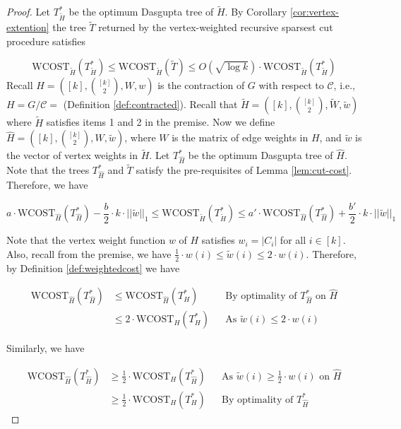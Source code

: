 \documentclass[letterpaper,11pt]{article}
\newcommand{\wCT}{\text{WCOST}}
\newcommand{\cC}{\mathcal{C}}
\theoremstyle{plain}
\theoremstyle{definition}
\theoremstyle{remark}
\newcommand{\wt}[1]{\widetilde{#1}}
\begin{document}
\begin{proof}
	Let $T^*_{\wt{H}}$ be the optimum Dasgupta tree of $\wt{H}$. By Corollary \ref{cor:vertex-extention} 
	the tree $\wt{T}$ returned by the vertex-weighted recursive sparsest cut procedure satisfies 

	\begin{equation} \label{eq:est1:tstar}
		\wCT_{\wt{H}}(T^*_{\wt{H}})\leq \wCT_{\wt{H}}(\wt{T}) \leq O(\sqrt{\log k})\cdot \wCT_{\wt{H}}(T^*_{\wt{H}})
	\end{equation}
Recall $H=\left([k], {[k] \choose 2}, W, w\right)$ is the contraction of $G$ with respect to $\cC$, 
	i.e., $H=G/\cC=$  (Definition \ref{def:contracted}). 
	Recall that $\widetilde{H} =\left([k], {[k] \choose 2}, \widetilde{W}, \widetilde{w}\right)$ 
	where $\widetilde{H}$ satisfies items 1 and 2 in the premise. Now we define 
	$\widehat{H}=\left([k], {[k] \choose 2}, W, \widetilde{w}\right)$, 
	where $W$ is the matrix of edge weights in $H$, and $\widetilde{w}$ is the vector of vertex weights in $\widetilde{H}$. Let $T^*_{\widehat{H}}$ be the optimum Dasgupta tree of $\widehat{H}$.
	Note that the trees $T^*_{\widehat{H}}$ and $\wt{T}$ satisfy the pre-requisites of
	Lemma \ref{lem:cut-cost}. Therefore, we have 

	\begin{equation}
		\label{eq:qhat-qtilde}
		a \cdot \wCT_{\widehat{H}}(T^*_{\widehat{H}}) - \frac{b}{2} \cdot k \cdot ||\widetilde{w}||_1   \leq \wCT_{\wt{H}}(T^*_{\wt{H}}) \leq a' \cdot \wCT_{\widehat{H}}(T^*_{\widehat{H}}) + \frac{b'}{2} \cdot k \cdot ||\widetilde{w}||_1  
	\end{equation}

	Note that the vertex weight function $w$ of $H$ satisfies $w_i=|C_i|$ 
	for all $i\in [k]$. Also, recall from the premise, we have 
	$\frac{1}{2}\cdot w(i)\leq\widetilde{w}(i)\leq 2\cdot w(i)$. Therefore, by 
	Definition \ref{def:weightedcost} we have

	\begin{align}
		\label{eq:tt'11}
		\wCT_{\widehat{H}}(T^*_{\widehat{H}}) 
		&\leq \wCT_{\widehat{H}}(T^*_{H}) &&\text{By optimality of $T^*_{\widehat{H}}$ on $\widehat{H}$} \nonumber\\
		&\leq 2\cdot \wCT_{H}(T^*_{H}) &&\text{As $\widetilde{w}(i)\leq 2\cdot w(i)$}
	\end{align}

	Similarly, we have

	\begin{align}
		\label{eq:tt'22}
		\wCT_{\widehat{H}}(T^*_{\widehat{H}}) 
		&\geq  \frac{1}{2}\cdot \wCT_{H}(T^*_{\widehat{H}}) &&\text{As $\widetilde{w}(i)\geq \frac{1}{2}\cdot w(i)$ on $\widehat{H}$} \nonumber \\
		&\geq \frac{1}{2}\cdot \wCT_{H}(T^*_{H}) &&\text{By optimality of $T^*_{\widehat{H}}$}
	\end{align}


\end{proof}
\end{document}
